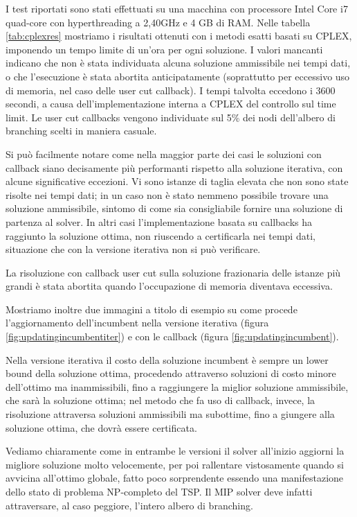 I test riportati sono stati effettuati su una macchina con processore Intel Core i7 quad-core con hyperthreading a 2,40GHz e 4 GB di RAM. Nelle tabella \ref{tab:cplexres} mostriamo i risultati ottenuti con i metodi esatti basati su CPLEX, imponendo un tempo limite di un'ora per ogni soluzione. I valori mancanti indicano che non è stata individuata alcuna soluzione ammissibile nei tempi dati, o che l'esecuzione è stata abortita anticipatamente (soprattutto per eccessivo uso di memoria, nel caso delle user cut callback). I tempi talvolta eccedono i 3600 secondi, a causa dell'implementazione interna a CPLEX del controllo sul time limit. Le user cut callbacks vengono individuate sul 5\% dei nodi dell'albero di branching scelti in maniera casuale.

Si può facilmente notare come nella maggior parte dei casi le soluzioni con callback siano decisamente più performanti rispetto alla soluzione iterativa, con alcune significative eccezioni. Vi sono istanze di taglia elevata che non sono state risolte nei tempi dati; in un caso non è stato nemmeno possibile trovare una soluzione ammissibile, sintomo di come sia consigliabile fornire una soluzione di partenza al solver. In altri casi l'implementazione basata su callbacks ha raggiunto la soluzione ottima, non riuscendo a certificarla nei tempi dati, situazione che con la versione iterativa non si può verificare.

La risoluzione con callback user cut sulla soluzione frazionaria delle istanze più grandi è stata abortita quando l'occupazione di memoria diventava eccessiva.

Mostriamo inoltre due immagini a titolo di esempio su come procede l'aggiornamento dell'incumbent nella versione iterativa (figura \ref{fig:updatingincumbentiter}) e con le callback (figura \ref{fig:updatingincumbent}).

Nella versione iterativa il costo della soluzione incumbent è sempre un lower bound della soluzione ottima, procedendo attraverso soluzioni di costo minore dell'ottimo ma inammissibili, fino a raggiungere la miglior soluzione ammissibile, che sarà la soluzione ottima; nel metodo che fa uso di callback, invece, la risoluzione attraversa soluzioni ammissibili ma subottime, fino a giungere alla soluzione ottima, che dovrà essere certificata.

Vediamo chiaramente come in entrambe le versioni il solver all'inizio aggiorni la migliore soluzione molto velocemente, per poi rallentare vistosamente quando si avvicina all'ottimo globale, fatto poco sorprendente essendo una manifestazione dello stato di problema NP-completo del TSP. Il MIP solver deve infatti attraversare, al caso peggiore, l'intero albero di branching.

